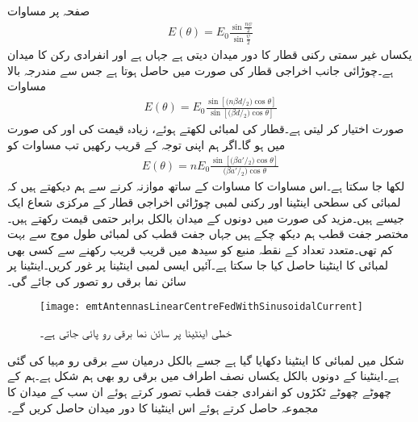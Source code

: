 صفحہ  پر مساوات 
\begin{align*}
E(\theta)=E_0 \frac{\sin \frac{n\psi}{2}}{\sin \frac{\psi}{2}}
\end{align*}
یکساں غیر سمتی  رکنی قطار کا دور میدان دیتی ہے جہاں  ہے اور  انفرادی رکن کا میدان ہے۔چوڑائی جانب اخراجی قطار  کی صورت میں حاصل ہوتا ہے جس سے مندرجہ بالا مساوات 
\begin{align}\label{مساوات_اینٹینا_چوڑائی_دوبارہ_الف}
E(\theta)=E_0 \frac{\sin [{(n \beta d}\!/\!_2)\cos \theta ]}{\sin [{(\beta d}\!/\!_2)\cos \theta ]}
\end{align}
صورت اختیار کر لیتی ہے۔قطار کی لمبائی  لکھتے ہوئے، زیادہ قیمت کی  اور  کی صورت میں  ہو گا۔اگر ہم اپنی توجہ  کے قریب رکھیں تب مساوات  کو 
\begin{align}
E(\theta)= n E_0 \frac{\sin [{( \beta a'}\!/\!_2)\cos \theta ]}{{(\beta a'}\!/\!_2)\cos \theta }
\end{align}
لکھا جا سکتا ہے۔اس مساوات کا مساوات  کے ساتھ موازنہ کرنے سے ہم دیکھتے ہیں کہ  لمبائی کی سطحی اینٹینا اور  رکنی  لمبی چوڑائی اخراجی قطار  کے مرکزی شعاع ایک جیسے ہیں۔مزید  کی صورت میں دونوں کے میدان بالکل برابر حتمی قیمت رکھتے ہیں۔
مختصر جفت قطب ہم دیکھ چکے ہیں جہاں جفت قطب کی لمبائی طول موج سے بہت کم  تھی۔متعدد تعداد کے نقطہ منبع کو سیدھ میں قریب قریب رکھنے سے کسی بھی لمبائی کا اینٹینا حاصل کیا جا سکتا ہے۔آئیں ایسی لمبی اینٹینا پر غور کریں۔اینٹینا پر سائن نما برقی رو تصور کی جائے گی۔

\begin{figure}
\centering
\texttt{[image: emtAntennasLinearCentreFedWithSinusoidalCurrent]}
\caption{خطی اینٹینا پر سائن نما برقی رو پائی جاتی ہے۔}
\label{شکل_اینٹینا_خطی_سائن_نما_برقی_رو}
\end{figure}

شکل  میں  لمبائی کا اینٹینا دکھایا گیا ہے جسے بالکل درمیان سے برقی رو مہیا کی گئی ہے۔اینٹینا کے دونوں بالکل یکساں نصف اطراف میں برقی رو بھی ہم شکل ہے۔ہم  کے چھوٹے چھوٹے ٹکڑوں  کو انفرادی جفت قطب تصور کرتے ہوئے ان سب کے میدان کا مجموعہ حاصل کرتے ہوئے اس اینٹینا کا دور میدان حاصل کریں گے۔

